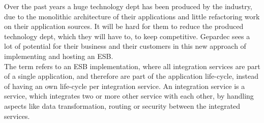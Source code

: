 Over the past years a huge technology dept has been produced by the industry, due to the monolithic architecture of their applications and little refactoring work on their application sources. It will be hard for them to reduce the produced technology dept, which they will have to, to keep competitive. Gepardec sees a lot of potential for their business and their customers in this new approach of implementing and hosting an ESB. \\

The term  refers to an ESB implementation, where all integration services are part of a single application, and therefore are part of the application life-cycle, instead of having an own life-cycle per integration service. An integration service is a service, which integrates two or more other service with each other, by handling aspects like data transformation, routing or security between the integrated services.  